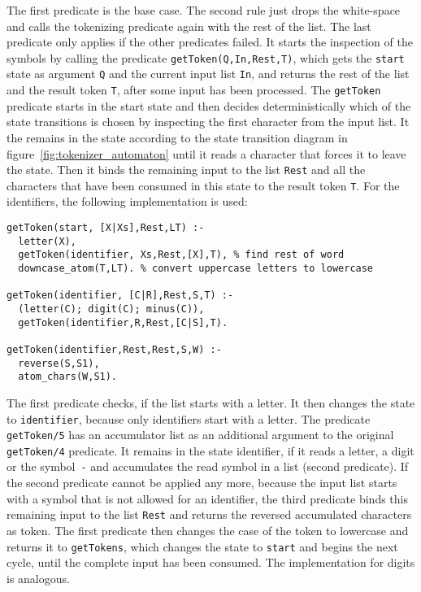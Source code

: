 The first predicate is the base case. The second rule just drops the white-space and calls the tokenizing predicate again with the rest of the list. The last predicate only applies if the other predicates failed. It starts the inspection of the symbols by calling the predicate \lstinline|getToken(Q,In,Rest,T)|, which gets the \lstinline|start| state as argument \lstinline|Q| and the current input list \lstinline|In|, and returns the rest of the list and the result token \lstinline|T|, after some input has been processed. The \lstinline|getToken| predicate starts in the start state and then decides deterministically which of the state transitions is chosen by inspecting the first character from the input list. It the remains in the state according to the state transition diagram in figure~\ref{fig:tokenizer_automaton} until it reads a character that forces it to leave the state. Then it binds the remaining input to the list \lstinline|Rest| and all the characters that have been consumed in this state to the result token \lstinline|T|. For the identifiers, the following implementation is used:

\begin{lstlisting}
getToken(start, [X|Xs],Rest,LT) :-
  letter(X), 
  getToken(identifier, Xs,Rest,[X],T), % find rest of word
  downcase_atom(T,LT). % convert uppercase letters to lowercase
  
getToken(identifier, [C|R],Rest,S,T) :-
  (letter(C); digit(C); minus(C)), 
  getToken(identifier,R,Rest,[C|S],T).
  
getToken(identifier,Rest,Rest,S,W) :-
  reverse(S,S1),
  atom_chars(W,S1). 
\end{lstlisting}

The first predicate checks, if the list starts with a letter. It then changes the state to \lstinline|identifier|, because only identifiers start with a letter. The predicate \lstinline|getToken/5| has an accumulator list as an additional argument to the original \lstinline|getToken/4| predicate. It remains in the state identifier, if it reads a letter, a digit or the symbol~\lstinline|-| and accumulates the read symbol in a list (second predicate). If the second predicate cannot be applied any more, because the input list starts with a symbol that is not allowed for an identifier, the third predicate binds this remaining input to the list \lstinline|Rest| and returns the reversed accumulated characters as token. The first predicate then changes the case of the token to lowercase and returns it to \lstinline|getTokens|, which changes the state to \lstinline|start| and begins the next cycle, until the complete input has been consumed. The implementation for digits is analogous.

